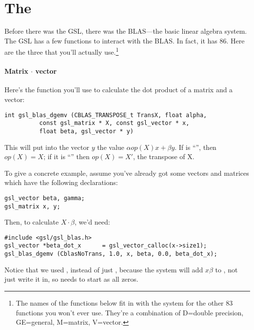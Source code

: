 \section{The } 
Before there was the GSL, there was the BLAS---the basic linear algebra
system. The GSL has a few functions to interact with the BLAS. In fact,
it has 86. Here are the three that you'll actually use.\footnote{
The names of the functions below fit in with the system for the other 83
functions you won't ever use. They're a combination of D=double precision,
GE=general, M=matrix, V=vector.}

\paragraph{Matrix $\cdot$ vector} Here's the function you'll use to calculate the dot product of a
matrix and a vector:
\begin{lstlisting}
int gsl_blas_dgemv (CBLAS_TRANSPOSE_t TransX, float alpha, 
          const gsl_matrix * X, const gsl_vector * x, 
          float beta, gsl_vector * y)
\end{lstlisting}

This will put into the vector $y$ the value $\alpha op(X) x + \beta y$. 
If  is ``'',  then $op(X)=X$; if it is
``'' then $op(X)=X'$, the transpose of X.


To give a concrete example, assume you've already got some vectors and matrices which have the following
declarations:
\begin{lstlisting}
gsl_vector beta, gamma;     
gsl_matrix x, y;           
\end{lstlisting}

Then, to calculate $X\cdot \beta$, we'd need:

\begin{lstlisting}
#include <gsl/gsl_blas.h>
gsl_vector *beta_dot_x      = gsl_vector_calloc(x->size1);
gsl_blas_dgemv (CblasNoTrans, 1.0, x, beta, 0.0, beta_dot_x);
\end{lstlisting}

Notice that we used , instead of just , because
the system will add $x\beta$ to , not just write it in,
so  needs to start as all zeros.

